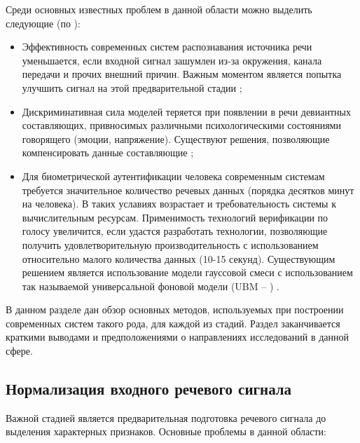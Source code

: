 Среди основных известных проблем в данной области можно выделить следующие (по \cite{Jayanna09overview}):
\begin{itemize}
\item Эффективность современных систем распознавания источника речи уменьшается, если входной сигнал зашумлен из-за окружения, канала передачи и прочих внешний причин. Важным моментом является попытка улучшить сигнал на этой предварительной стадии \cite{Greenwood00suv};
\item Дискриминативная сила моделей теряется при появлении в речи девиантных составляющих, привносимых различными психологическими состояниями говорящего (эмоции, напряжение). Существуют решения, позволяющие компенсировать данные составляющие \cite{Alamo96discriminative};
\item Для биометрической аутентификации человека современным системам требуется значительное количество речевых данных (порядка десятков минут на человека). В таких уславиях возрастает и требовательность системы к вычислительным ресурсам. Применимость технологий верификации по голосу увеличится, если удастся разработать технологии, позволяющие получить удовлетворительную производительность с использованием относительно малого количества данных (10-15 секунд). Существующим решением является использование модели гауссовой смеси с использованием так называемой универсальной фоновой модели (UBM -- ) \cite{Reynolds00speakerverification}.
\end{itemize}

В данном разделе дан обзор основных методов, используемых при построении современных систем такого рода, для каждой из стадий. Раздел заканчивается краткими выводами и предположениями о направлениях исследований в данной сфере.

\subsection{Нормализация входного речевого сигнала}

Важной стадией является предварительная подготовка речевого сигнала до выделения характерных признаков. Основные проблемы в данной области:

